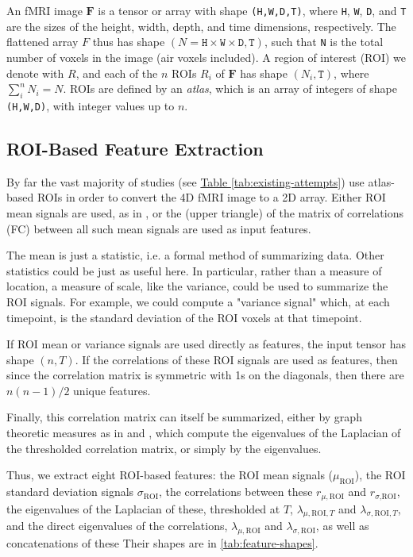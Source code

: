 \documentclass[10pt]{article}
\begin{document}
An fMRI image \(\bm{F}\) is a tensor or array with shape \texttt{(H,W,D,T)}, where \texttt{H},
\texttt{W}, \texttt{D}, and \texttt{T} are the sizes of the height, width, depth, and time
dimensions, respectively. The flattened array \(F\) thus has shape \((N = \texttt{H} \times
\texttt{W} \times \texttt{D}, \texttt{T})\), such that \texttt{N} is the total number of voxels in
the image (air voxels included). A region of interest (ROI) we denote with \(R\), and each of the
\(n\) ROIs \(R_i\) of \(\bm{F}\) has shape \((N_i, \texttt{T})\), where \(\sum_i^n N_i= N\). ROIs
are defined by an \emph{atlas}, which is an array of integers of shape \texttt{(H,W,D)}, with
integer values up to \(n\).


\subsection{ROI-Based Feature Extraction}

By far the vast majority of studies (see \hyperref[tab:existing-attempts]{Table
\ref{tab:existing-attempts}}) use atlas-based ROIs in order to convert the 4D fMRI image to a 2D
array. Either ROI mean signals are used, as in \citet{el-gazzarHybrid3DCNN3DCLSTM2019}, or the
(upper triangle) of the matrix of correlations (FC) between all such mean signals are used as input
features.

The mean is just a statistic, i.e. a formal method of summarizing data. Other statistics could be
just as useful here. In particular, rather than a measure of location, a measure of scale, like the
variance, could be used to summarize the ROI signals. For example, we could compute a "variance
signal" which, at each timepoint, is the standard deviation of the ROI voxels at that timepoint.

If ROI mean or variance signals are used directly as features, the input tensor has shape \((n,
T)\). If the correlations of these ROI signals are used as features, then since the correlation
matrix is symmetric with 1s on the diagonals, then there are \(n(n-1)/2\) unique features.

Finally, this correlation matrix can itself be summarized, either by graph theoretic measures as in
\citet{yinDiagnosisAutismSpectrum2021} and \citet{mostafaDiagnosisAutismSpectrum2019}, which compute
the eigenvalues of the Laplacian of the thresholded correlation matrix, or simply by the
eigenvalues.

Thus, we extract eight ROI-based features: the ROI mean signals (\(\mu_{\text{ROI}}\)), the ROI
standard deviation signals \(\sigma_{\text{ROI}}\), the correlations between these
\(r_{\mu,\text{ROI}}\) and \(r_{\sigma\text{,ROI}}\), the eigenvalues of the Laplacian of these,
thresholded at \(T\), \(\lambda_{\mu,\text{ROI},T}\) and \(\lambda_{\sigma,\text{ROI},T}\), and the
direct eigenvalues of the correlations, \(\lambda_{\mu,\text{ROI}}\) and
\(\lambda_{\sigma,\text{ROI}}\), as well as concatenations of these  Their shapes are in \ref{tab:feature-shapes}.
\end{document}
